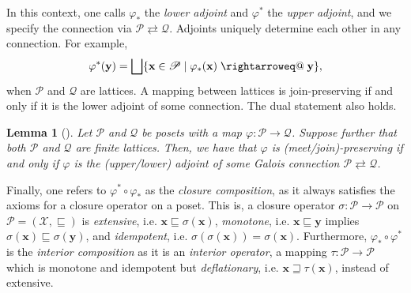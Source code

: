 \documentclass[11pt]{article}
\makeatletter
\newtheorem{lemma}[theorem]{Lemma}
\DeclareMathOperator{\raisedrightarrow}{\raisebox{+0.15ex}{$\rightarrow$}}
\newcommand{\rightarroweq}{\mathrel{\mathpalette\rightarroweq@\relax}}
\newcommand{\rightarroweq@}[2]{%
  \vtop{
      \sbox\z@{$\m@th#1\raisedrightarrow$}%
    \ialign{%
      \hfil##\hfil\cr
      \copy\z@\cr
      \noalign{\nointerlineskip\kern0.7\ht\z@}
      \makebox[\wd\z@][s]{$\m@th#1\relbar\hss\relbar$}\cr
      \noalign{\kern-0.7\ht\z@}
    }%
  }%
}
\makeatother
\begin{document}
In this context, one calls $\varphi_*$ the \emph{lower adjoint} and $\varphi^*$ the \emph{upper adjoint}, and we specify the connection via $\mathscr{P}\rightleftarrows\mathscr{Q}$.
Adjoints uniquely determine each other in any connection.
For example,
\begin{equation}\label{eq:adjoints}
    \varphi^*(\mathbf{y}) = \bigsqcup\{\mathbf{x}\in\mathscr{P}\mid \varphi_*(\mathbf{x})\rightarroweq \mathbf{y}\},
\end{equation}
when $\mathscr{P}$ and $\mathscr{Q}$ are lattices.
A mapping between lattices is join-preserving if and only if it is the lower adjoint of some connection.
The dual statement also holds.

\begin{lemma}[\cite{davey2002introduction}]\label{lem:gc-join}
    Let $\mathscr{P}$ and $\mathscr{Q}$ be posets with a map $\varphi:\mathscr{P}\to\mathscr{Q}$.
    Suppose further that both $\mathscr{P}$ and $\mathscr{Q}$ are finite lattices.
    Then, we have that $\varphi$ is (meet/join)-preserving if and only if $\varphi$ is the (upper/lower) adjoint of some Galois connection $\mathscr{P}\rightleftarrows\mathscr{Q}$.
\end{lemma}

Finally, one refers to $\varphi^*\circ\varphi_*$ as the \emph{closure composition}, as it always satisfies the axioms for a closure operator on a poset.
This is, a closure operator $\sigma:\mathscr{P}\to\mathscr{P}$ on $\mathscr{P} = (\mathcal{X},\sqsubseteq)$ is \emph{extensive}, i.e. $\mathbf{x}\sqsubseteq\sigma(\mathbf{x})$, \emph{monotone}, i.e. $\mathbf{x}\sqsubseteq \mathbf{y}$ implies $\sigma(\mathbf{x})\sqsubseteq\sigma(\mathbf{y})$, and \emph{idempotent}, i.e. $\sigma(\sigma(\mathbf{x})) = \sigma(\mathbf{x})$.
Furthermore, $\varphi_*\circ\varphi^*$ is the \emph{interior composition} as it is an \emph{interior operator}, a mapping $\tau:\mathscr{P}\to\mathscr{P}$ which is monotone and idempotent but \emph{deflationary}, i.e. $\mathbf{x} \sqsupseteq \tau(\mathbf{x})$, instead of extensive.
\end{document}
